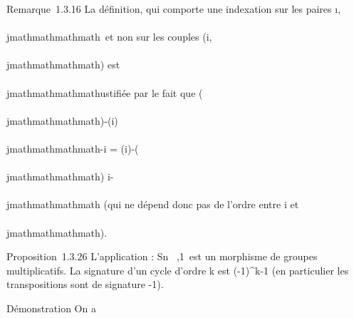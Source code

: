 Remarque~1.3.16 La définition, qui comporte une indexation sur les
paires \i,\\\\jmathmathmathmath\ et non sur les couples
(i,\\\\jmathmathmathmath) est \\\\jmathmathmathmathustifiée par le fait que  \sigma(\\\\jmathmathmathmath)-\sigma(i) \over
\\\\jmathmathmathmath-i = \sigma(i)-\sigma(\\\\jmathmathmathmath) \over i-\\\\jmathmathmathmath (qui ne dépend donc pas
de l'ordre entre i et \\\\jmathmathmathmath).

Proposition~1.3.26 L'application \epsilon : Sn \rightarrow~,1\ est un morphisme de groupes multiplicatifs. La
signature d'un cycle d'ordre k est (-1)^k-1 (en particulier
les transpositions sont de signature -1).

Démonstration On a

